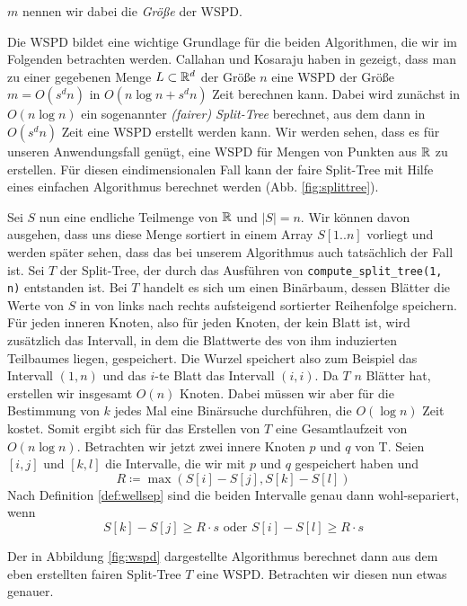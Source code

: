 \noindent $m$ nennen wir dabei die \emph{Größe} der WSPD.

Die WSPD bildet eine wichtige Grundlage für die beiden Algorithmen, die wir im Folgenden betrachten werden. 
Callahan und Kosaraju haben in \cite{callahan} gezeigt, dass man zu einer gegebenen Menge $L \subset \mathbb{R}^d$ der Größe $n$ eine WSPD  der Größe $m = O(s^dn)$ in $O(n\log n + s^dn)$ Zeit berechnen kann. 
Dabei wird zunächst in $O(n \log n)$ ein sogenannter \emph{(fairer) Split-Tree} berechnet, aus dem dann in $O(s^dn)$ Zeit eine WSPD erstellt werden kann. 
Wir werden sehen, dass es für unseren Anwendungsfall genügt, eine WSPD für Mengen von Punkten aus $\mathbb{R}$ zu erstellen. 
Für diesen eindimensionalen Fall kann der faire Split-Tree mit Hilfe eines einfachen Algorithmus berechnet werden (Abb. \ref{fig:splittree}).



Sei $S$ nun eine endliche Teilmenge von $\mathbb{R}$ und $|S| = n$. 
Wir können davon ausgehen, dass uns diese Menge sortiert in einem Array $S[1..n]$ vorliegt und werden später sehen, dass das bei unserem Algorithmus auch tatsächlich der Fall ist. 
Sei $T$ der Split-Tree, der durch das Ausführen von \texttt{compute\_split\_tree(1, n)} entstanden ist.
Bei $T$ handelt es sich um einen Binärbaum, dessen Blätter die Werte von $S$ in von links nach rechts aufsteigend sortierter Reihenfolge speichern. 
Für jeden inneren Knoten, also für jeden Knoten, der kein Blatt ist, wird zusätzlich das Intervall, in dem die Blattwerte des von ihm induzierten Teilbaumes liegen, gespeichert.
Die Wurzel speichert also zum Beispiel das Intervall $(1, n)$ und das $i$-te Blatt das Intervall $(i, i)$.
Da $T$ $n$ Blätter hat, erstellen wir insgesamt $O(n)$ Knoten. 
Dabei müssen wir aber für die Bestimmung von $k$ jedes Mal eine Binärsuche durchführen, die $O(\log n)$ Zeit kostet. 
Somit ergibt sich für das Erstellen von $T$ eine Gesamtlaufzeit von $O(n\log n)$.
Betrachten wir jetzt zwei innere Knoten $p$ und $q$ von T. Seien $[i, j]$ und $[k, l]$ die Intervalle, die wir mit $p$ und $q$ gespeichert haben und 
\[
R \coloneqq \max(S[i] - S[j], S[k] - S[l])
\]
Nach Definition \ref{def:wellsep} sind die beiden Intervalle genau dann wohl-separiert, wenn 
\[
S[k] - S[j] \geq R \cdot s \text{ oder } S[i] - S[l] \geq R \cdot s 
\]



Der in Abbildung \ref{fig:wspd} dargestellte Algorithmus berechnet dann aus dem eben erstellten fairen Split-Tree $T$ eine WSPD.
Betrachten wir diesen nun etwas genauer.
 
